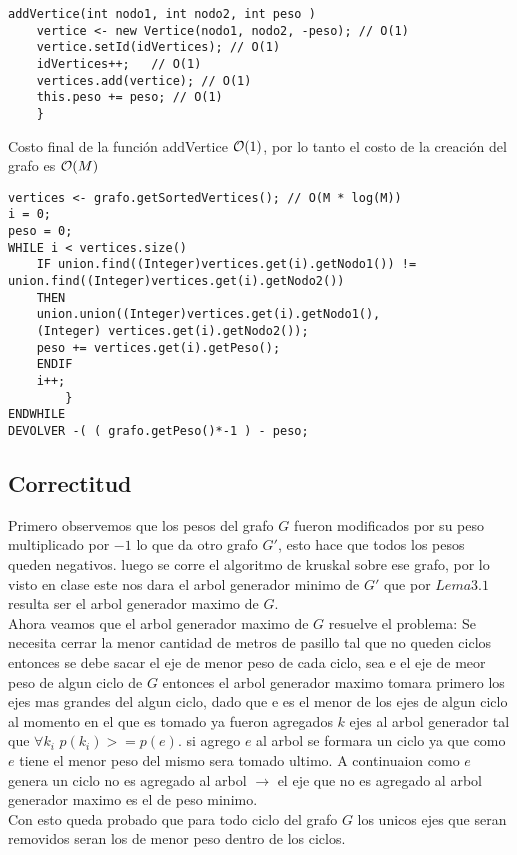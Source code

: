 \begin{lstlisting}
addVertice(int nodo1, int nodo2, int peso ) 
	vertice <- new Vertice(nodo1, nodo2, -peso); // O(1)
	vertice.setId(idVertices); // O(1)
	idVertices++;	// O(1)
	vertices.add(vertice); // O(1)
	this.peso += peso; // O(1)
	}
\end{lstlisting}
Costo final de la funci\'on addVertice $\mathcal{O}(1)$, por lo tanto el costo de la creaci\'on del grafo es $\mathcal{O}(M)$

\begin{lstlisting}
vertices <- grafo.getSortedVertices(); // O(M * log(M))
i = 0;
peso = 0;
WHILE i < vertices.size()
	IF union.find((Integer)vertices.get(i).getNodo1()) != union.find((Integer)vertices.get(i).getNodo2())
	THEN   
	union.union((Integer)vertices.get(i).getNodo1(),
	(Integer) vertices.get(i).getNodo2());
	peso += vertices.get(i).getPeso();
	ENDIF
	i++;
		}
ENDWHILE
DEVOLVER -( ( grafo.getPeso()*-1 ) - peso;
\end{lstlisting}
\subsection{Correctitud}

    Primero observemos que los pesos del grafo $G$ fueron modificados por su peso multiplicado por $-1$ lo que da otro grafo $G'$, esto hace que todos los pesos queden negativos. luego se corre el algoritmo de kruskal sobre ese grafo, por lo visto en clase este nos dara el arbol generador minimo de $G'$ que por $Lema 3.1$ resulta ser el arbol generador maximo de $G$. \\
    
    Ahora veamos que el arbol generador maximo de $G$ resuelve el problema: Se necesita cerrar la menor cantidad de metros de pasillo tal que no queden ciclos entonces se debe sacar el eje de menor peso de cada ciclo, sea e el eje de meor peso de algun ciclo de $G$ entonces el arbol generador maximo tomara primero los ejes mas grandes del algun ciclo, dado que e es el menor de los ejes de algun ciclo al momento en el que es tomado ya fueron agregados $k$ ejes al arbol generador tal que $\forall k_i$ $p(k_i) >= p(e)$. si agrego $e$ al arbol se formara un ciclo ya que como $e$ tiene el menor peso del mismo sera tomado ultimo. A continuaion como $e$ genera un ciclo no es agregado al arbol $\rightarrow$ el eje que no es agregado al arbol generador maximo es el de peso minimo. \\
    
    Con esto queda probado que para todo ciclo del grafo $G$ los unicos ejes que seran removidos seran los de menor peso dentro de los ciclos.
    
